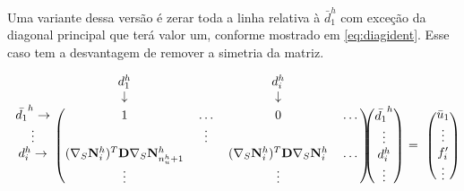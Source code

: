 Uma variante dessa versão é zerar toda a linha relativa à $\bar{d}^h_1$ com exceção da diagonal principal que terá valor um, conforme mostrado em \eqref{eq:diagident}. Esse caso tem a desvantagem de remover a simetria da matriz.

\begin{equation} \label{eq:diagident}
\begin{blockarray}{ccccc}
& d_1^h &  & d_i ^h & & \\
& \downarrow &  & \downarrow & & \\
\begin{block}{c(cccc)}
\bar{d_1}^h \rightarrow & 1 & \hdots & 0 & \hdots \\
\vdots                  &   & \vdots &             \\
d_i^h       \rightarrow & \kij{i}{n_u^h + 1}   &      & \kij{i}{i}   & \hdots \\
& \vdots &      & \vdots   &  \\
\end{block}
\end{blockarray} \begin{blockarray}{c}
 \\
 \\
\begin{block}{(c)}
\bar{d_1}^h \\
\vdots\\
d_i^h \\
\vdots  \\
\end{block}
\end{blockarray} \begin{blockarray}{c}
 \\
 \\
 \\
= \\
 \\
\end{blockarray} \begin{blockarray}{c}
 \\
 \\
\begin{block}{(c)}
 \bar{u}_1 \\
\vdots\\
f^\prime_i \\
\vdots  \\
\end{block}
\end{blockarray}
\end{equation}


